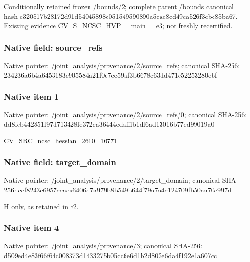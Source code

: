 \documentclass[10pt,a4paper]{article}
\begin{document}
\begingroup\raggedright\sloppy Conditionally retained frozen /\allowbreak{}bounds/\allowbreak{}2;\allowbreak{} complete parent /\allowbreak{}bounds canonical hash c320517b28172d91d54045898e051549590890a5eae8ed49ca526f3ebc85ba67. Existing evidence CV\_\allowbreak{}S\_\allowbreak{}NCSC\_\allowbreak{}HVP\_\allowbreak{}\_\allowbreak{}main\_\allowbreak{}\_\allowbreak{}e3;\allowbreak{} not freshly recertified.\par\endgroup

\subsubsection{Native field: source\_\allowbreak{}refs}
Native pointer: /joint\_\allowbreak{}analysis/provenance/2/source\_\allowbreak{}refs; canonical SHA-256: 234236a6b4a6453183e905584a21f0e7ee59af3b6678c63dd471c52253280ebf

\subsubsection{Native item 1}
Native pointer: /joint\_\allowbreak{}analysis/provenance/2/source\_\allowbreak{}refs/0; canonical SHA-256: dd8fcb442851f97d713428fe372ca36444edafffb1df6ad13016b77ed99019a0

\begingroup\raggedright\sloppy CV\_\allowbreak{}SRC\_\allowbreak{}ncsc\_\allowbreak{}hessian\_\allowbreak{}2610\_\allowbreak{}16771\par\endgroup

\subsubsection{Native field: target\_\allowbreak{}domain}
Native pointer: /joint\_\allowbreak{}analysis/provenance/2/target\_\allowbreak{}domain; canonical SHA-256: cef8243c6957ceaea6406d7a979b8b549b644f79a7a4c124709fb50aa70e997d

\begingroup\raggedright\sloppy H only,\allowbreak{} as retained in c2.\par\endgroup

\subsubsection{Native item 4}
Native pointer: /joint\_\allowbreak{}analysis/provenance/3; canonical SHA-256: d509ed4e83f66f64c008373d1433275b05cc6e6d1b2d802e6da4f192e1a607cc
\end{document}
